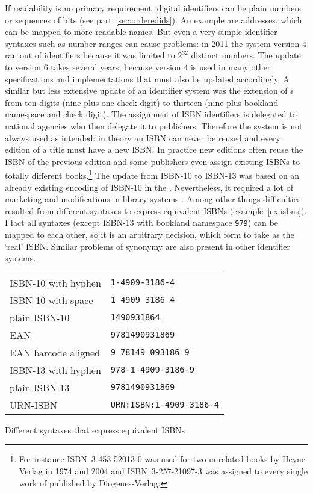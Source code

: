If readability is no primary requirement, digital identifiers can be plain 
numbers or sequences of bits (see part~\ref{sec:orderedids}). An example are 
 addresses, which can be mapped to more readable  names.
But even a very simple identifier syntaxes such as number ranges can cause 
problems: in 2011 the  system version 4 ran out of identifiers because
it was limited to $2^{32}$ distinct numbers. The update to  version 6 
takes several years, because version 4 is used in many other specifications and 
implementations that must also be updated accordingly. A similar but less 
extensive update of an identifier
system was the extension of s
from ten digits (nine plus one check digit) to thirteen (nine plus 
bookland namespace and check digit). The assignment of ISBN identifiers
is delegated to national agencies who then delegate it to publishers. Therefore
the system is not always used as intended: in theory an ISBN can 
never be reused and every edition of a title must have a new ISBN. In practice
new editions often reuse the ISBN of the previous edition and some publishers 
even assign existing ISBNs to totally different books.\footnote{For instance
ISBN~3-453-52013-0 was used for two unrelated books by Heyne-Verlag
in 1974 and 2004 and ISBN~3-257-21097-3 was assigned to every single work 
of  published by Diogenes-Verlag.} The update from 
ISBN-10 to ISBN-13 was based on an already existing encoding  of ISBN-10 in
the . Nevertheless, it required a lot 
of marketing and modifications in library 
systems \cite{vanHalm2005}. Among other things difficulties resulted 
from different syntaxes to express equivalent ISBNs (example~\ref{ex:isbns}).
I fact all syntaxes (except ISBN-13 with bookland namespace \texttt{979}) 
can be mapped to each other, so it is an arbitrary decision, which form to 
take as the `real' ISBN. Similar problems of synonymy are also present in
other identifier systems.

\begin{example}[h]
\centering
\begin{tabular}{l|l}
ISBN-10 with hyphen & \texttt{1-4909-3186-4} \\
ISBN-10 with space  & \texttt{1 4909 3186 4} \\
plain ISBN-10 & \texttt{1490931864} \\
EAN & \texttt{9781490931869} \\
EAN barcode aligned & \texttt{9 78149 093186 9} \\
ISBN-13 with hyphen & \texttt{978-1-4909-3186-9} \\
plain ISBN-13 & \texttt{9781490931869} \\
URN-ISBN & \texttt{URN:ISBN:1-4909-3186-4} \\ %
\end{tabular}
\caption{Different syntaxes that express equivalent ISBNs}
\label{ex:isbns}
\end{example}

